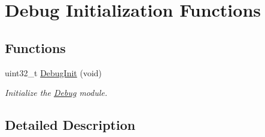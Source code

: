 \hypertarget{group___debug___exported___functions___group1}{}\section{Debug Initialization Functions}
\label{group___debug___exported___functions___group1}
\subsection*{Functions}
\begin{DoxyCompactItemize}
\item 
uint32\+\_\+t \hyperlink{group___debug___exported___functions___group1_gadd3262925f11ab443ccc41951f84f471}{Debug\+Init} (void)\hypertarget{group___debug___exported___functions___group1_gadd3262925f11ab443ccc41951f84f471}{}\label{group___debug___exported___functions___group1_gadd3262925f11ab443ccc41951f84f471}

\begin{DoxyCompactList}\small\item\em Initialize the \hyperlink{group___debug}{Debug} module. \end{DoxyCompactList}\end{DoxyCompactItemize}


\subsection{Detailed Description}
